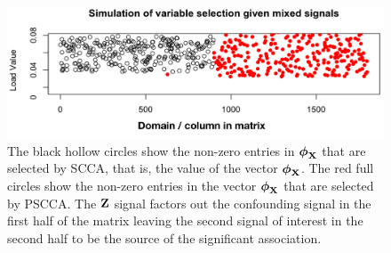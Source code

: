 \documentclass{llncs}
\newcommand{\X}{{\bf X}}
\newcommand{\Z}{{\bf Z}}
\newcommand{\bs}{\boldsymbol}
\begin{document}
\begin{figure}
\begin{center}
\includegraphics[width=120mm]{simulation_result_mix.pdf} 
\end{center}
\vspace{-0.2in}
\caption{The black hollow circles show the non-zero entries in
  $\bs\phi_{\X}$ that are selected by SCCA, that is, the value of the vector
  $\bs\phi_{\X}$.  The red full circles show the non-zero entries in
  the vector $\bs\phi_{\X}$ that are selected by PSCCA.  The $\Z$ signal factors
  out the confounding signal in the first half of the matrix leaving
  the second signal of interest in the second half to be the source of
the significant association.}
\label{fig:sim}
\end{figure}
\vspace{-0.1in}
\end{document}
